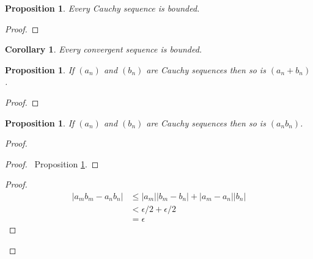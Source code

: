 \documentclass{article}
\let\qed\relax
\newtheorem{proposition}[axiom]{Proposition}
\newtheorem{corollary}{Corollary}[axiom]
\theoremstyle{definition}
\begin{document}
    \begin{proposition}
        \label{prop:Cauchy_bounded}
        Every Cauchy sequence is bounded.
    \end{proposition}

    \begin{proof}
        \pf
        \qed
    \end{proof}

    \begin{corollary}
        Every convergent sequence is bounded.
    \end{corollary}
    
    \begin{proposition}
        If $(a_n)$ and $(b_n)$ are Cauchy sequences then so is $(a_n + b_n)$.
    \end{proposition}

    \begin{proof}
        \pf
        \qed
    \end{proof}

    \begin{proposition}
        If $(a_n)$ and $(b_n)$ are Cauchy sequences then so is $(a_n b_n)$.
    \end{proposition}

    \begin{proof}
        \pf
        \begin{proof}
            \pf\ Proposition \ref{prop:Cauchy_bounded}.
        \end{proof}
        \begin{proof}
            \pf
            \begin{align*}
                |a_m b_m - a_n b_n| & \leq |a_m| |b_m - b_n| + |a_m - a_n| |b_n| \\
                & < \epsilon / 2 + \epsilon / 2 \\
                & = \epsilon
            \end{align*}
        \end{proof}
        \qed
    \end{proof}
\end{document}
